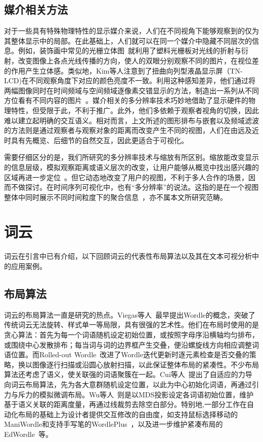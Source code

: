 \subsection{媒介相关方法}
对于一些具有特殊物理特性的显示媒介来说，人们在不同视角下能够观察到的仅为其整体显示中的局部。在此基础上，人们就可以在同一个媒介中隐藏不同层次的信息。例如，装饰画中常见的光栅立体图~\supercite{Yitzhak2018}就利用了塑料光栅板对光线的折射与衍射，改变图像上各点光线传播的方向，使人的双眼分别观察不同的图片，在视位差的作用产生立体感。类似地，Kim等人注意到了扭曲向列型液晶显示屏（TN-LCD)在不同观察角度下对应的颜色亮度不一致。利用这种感知差异，他们通过将两幅图像同时在时间频域与空间频域逐像素交错显示的方法，制造出一系列从不同方位看有不同内容的图片~\supercite{Kim2012}。媒介相关的多分辨率技术巧妙地借助了显示硬件的物理特性，但受限于此，不利于推广。此外，他们多依赖于观察者视角的切换，因此难以建立起明确的交互语义。相对而言，上文所述的图形排布与嵌套以及频域滤波的方法则是通过观察者与观察对象的距离而改变产生不同的视图，人们在由远及近时具有先概览、后细节的自然交互，因此更适合于可视化。

\bigbreak
需要仔细区分的是，我们所研究的多分辨率技术与缩放有所区别。缩放能改变显示的信息层级，模拟观察距离或语义层次的改变，让用户能够从概览中找出感兴趣的区域再进一步定位~\supercite{Cockburn2009}。但它动态地改变了用户的视图，不利于多人合作的场景，因而不做探讨。在时间序列可视化中，也有“多分辨率”的说法。这指的是在一个视图整体中同时展示不同时间粒度下的聚合信息~\supercite{Hao2007}，亦不属本文所研究范畴。

\section{词云}
词云在引言中已有介绍，以下回顾词云的代表性布局算法以及其在文本可视分析中的应用案例。

\subsection{布局算法}
词云的布局算法一直是研究的热点。Viegas等人~\supercite{Viegas2009}最早提出Wordle的概念，突破了传统词云无法旋转、样式单一等局限，具有很强的艺术性。他们在布局时使用的是贪心算法：首先为每一个词语随机设定初始位置，或按照字母序沿横轴均匀排布，或围绕中心发散排布；每当词与词的边界框产生交叠，便沿螺旋线方向相应调整词语位置。而Rolled-out Wordle~\supercite{Strobelt2012}改进了Wordle迭代更新时逐元素检查是否交叠的策略，换以图像逐行扫描或沿圆心放射扫描，以此保证整体布局的紧凑性。不少布局算法还考虑了语义，使关联强的词语聚簇在一起。Cui等人~\supercite{Cui2010}提出了自适应的力导向词云布局算法，先为各大意群随机设定位置，以此为中心初始化词语，再通过引力与斥力的模拟微调布局。Wu等人~\supercite{Wu2011}则是以MDS投影设定各词语初始位置，维护基于语义关联的距离度量，再通过线裁剪去除空白部分。特别地,一部分工作在自动化布局的基础上为设计者提供交互修改的自由度，如支持鼠标选择移动的ManiWordle\supercite{Koh2010}和支持手写笔的WordlePlus~\supercite{Jo2015}，以及进一步维护紧凑布局的EdWordle~\supercite{Wang2018}等。

